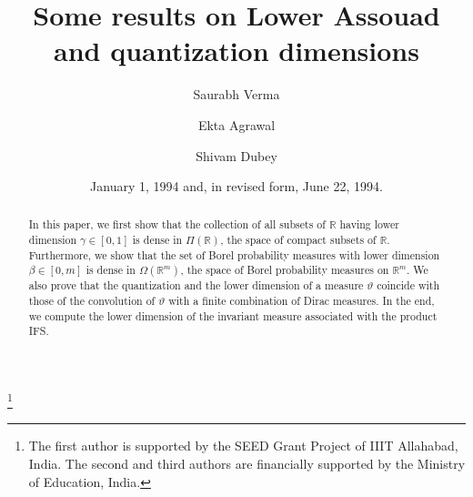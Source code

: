 \documentclass{amsproc}
\theoremstyle{definition}
\theoremstyle{remark}
\numberwithin{equation}{section}
\begin{document}
\title[Some results on Lower Assouad and quantization dimensions]{Some results on Lower Assouad and quantization dimensions}




\author{Saurabh Verma}
\address{Department of Applied Sciences, IIIT Allahabad, Prayagraj, India 211015}
\thanks{The first author is supported by the SEED Grant Project of IIIT Allahabad, India. The second and third authors are financially supported by the Ministry of Education, India.}


\author{Ekta Agrawal}
\address{Department of Applied Sciences, IIIT Allahabad, Prayagraj, India 211015}
%

\author{Shivam Dubey}
\address{Department of Applied Sciences, IIIT Allahabad, Prayagraj, India 211015}
%




\date{January 1, 1994 and, in revised form, June 22, 1994.}



\begin{abstract}
In this paper, we first show that the collection of all subsets of \( \mathbb{R} \) having lower dimension \( \gamma \in [0,1] \) is dense in \( \Pi(\mathbb{R}) \), the space of compact subsets of \( \mathbb{R} \). Furthermore, we show that the set of Borel probability measures with lower dimension \( \beta \in [0, m] \) is dense in \( \Omega(\mathbb{R}^m) \), the space of Borel probability measures on \( \mathbb{R}^m \). We also prove that the quantization and the lower dimension of a measure \( \vartheta \) coincide with those of the convolution of \( \vartheta \) with a finite combination of Dirac measures. In the end, we compute the lower dimension of the invariant measure associated with the product IFS.

\end{abstract}
\end{document}
